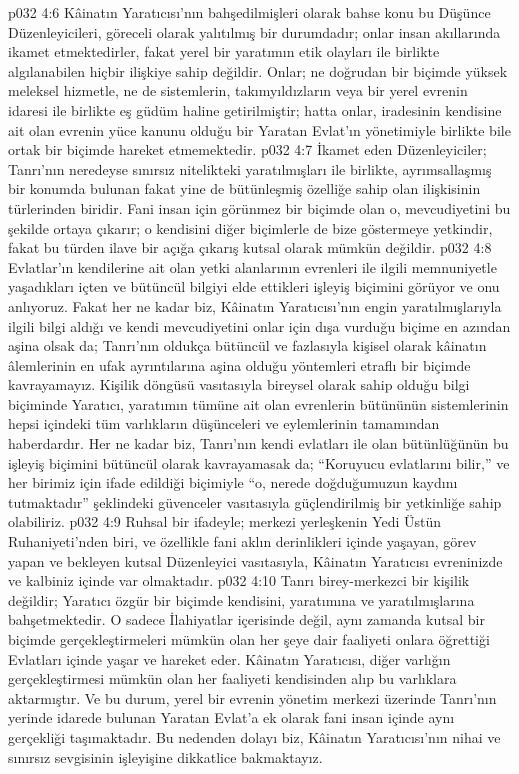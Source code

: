 \vs p032 4:6 Kâinatın Yaratıcısı’nın bahşedilmişleri olarak bahse konu bu Düşünce Düzenleyicileri, göreceli olarak yalıtılmış bir durumdadır; onlar insan akıllarında ikamet etmektedirler, fakat yerel bir yaratımın etik olayları ile birlikte algılanabilen hiçbir ilişkiye sahip değildir. Onlar; ne doğrudan bir biçimde yüksek meleksel hizmetle, ne de sistemlerin, takımyıldızların veya bir yerel evrenin idaresi ile birlikte eş güdüm haline getirilmiştir; hatta onlar, iradesinin kendisine ait olan evrenin yüce kanunu olduğu bir Yaratan Evlat’ın yönetimiyle birlikte bile ortak bir biçimde hareket etmemektedir.
\vs p032 4:7 İkamet eden Düzenleyiciler; Tanrı’nın neredeyse sınırsız nitelikteki yaratılmışları ile birlikte, ayrımsallaşmış bir konumda bulunan fakat yine de bütünleşmiş özelliğe sahip olan ilişkisinin türlerinden biridir. Fani insan için görünmez bir biçimde olan o, mevcudiyetini bu şekilde ortaya çıkarır; o kendisini diğer biçimlerle de bize göstermeye yetkindir, fakat bu türden ilave bir açığa çıkarış kutsal olarak mümkün değildir.
\vs p032 4:8 Evlatlar’ın kendilerine ait olan yetki alanlarının evrenleri ile ilgili memnuniyetle yaşadıkları içten ve bütüncül bilgiyi elde ettikleri işleyiş biçimini görüyor ve onu anlıyoruz. Fakat her ne kadar biz, Kâinatın Yaratıcısı’nın engin yaratılmışlarıyla ilgili bilgi aldığı ve kendi mevcudiyetini onlar için dışa vurduğu biçime en azından aşina olsak da; Tanrı’nın oldukça bütüncül ve fazlasıyla kişisel olarak kâinatın âlemlerinin en ufak ayrıntılarına aşina olduğu yöntemleri etraflı bir biçimde kavrayamayız. Kişilik döngüsü vasıtasıyla bireysel olarak sahip olduğu bilgi biçiminde Yaratıcı, yaratımın tümüne ait olan evrenlerin bütününün sistemlerinin hepsi içindeki tüm varlıkların düşünceleri ve eylemlerinin tamamından haberdardır. Her ne kadar biz, Tanrı’nın kendi evlatları ile olan bütünlüğünün bu işleyiş biçimini bütüncül olarak kavrayamasak da; “Koruyucu evlatlarını bilir,” ve her birimiz için ifade edildiği biçimiyle “o, nerede doğduğumuzun kaydını tutmaktadır” şeklindeki güvenceler vasıtasıyla güçlendirilmiş bir yetkinliğe sahip olabiliriz.
\vs p032 4:9 Ruhsal bir ifadeyle; merkezi yerleşkenin Yedi Üstün Ruhaniyeti’nden biri, ve özellikle fani aklın derinlikleri içinde yaşayan, görev yapan ve bekleyen kutsal Düzenleyici vasıtasıyla, Kâinatın Yaratıcısı evreninizde ve kalbiniz içinde var olmaktadır.
\vs p032 4:10 Tanrı birey\hyp{}merkezci bir kişilik değildir; Yaratıcı özgür bir biçimde kendisini, yaratımına ve yaratılmışlarına bahşetmektedir. O sadece İlahiyatlar içerisinde değil, aynı zamanda kutsal bir biçimde gerçekleştirmeleri mümkün olan her şeye dair faaliyeti onlara öğrettiği Evlatları içinde yaşar ve hareket eder. Kâinatın Yaratıcısı, diğer varlığın gerçekleştirmesi mümkün olan her faaliyeti kendisinden alıp bu varlıklara aktarmıştır. Ve bu durum, yerel bir evrenin yönetim merkezi üzerinde Tanrı’nın yerinde idarede bulunan Yaratan Evlat’a ek olarak fani insan içinde aynı gerçekliği taşımaktadır. Bu nedenden dolayı biz, Kâinatın Yaratıcısı’nın nihai ve sınırsız sevgisinin işleyişine dikkatlice bakmaktayız.
